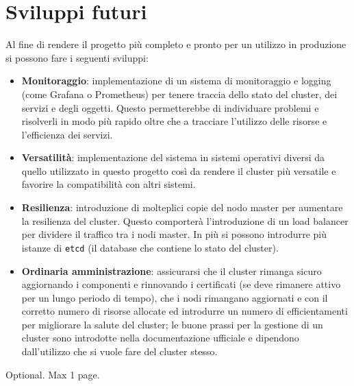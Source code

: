 \documentclass[12pt,a4paper,openright,twoside]{book}
\begin{document}
\section{Sviluppi futuri}
Al fine di rendere il progetto più completo e pronto per un utilizzo in produzione si possono fare i seguenti sviluppi:
\begin{itemize}
    \item {\textbf{Monitoraggio}: implementazione di un sistema di monitoraggio e logging (come Grafana o Prometheus) per tenere traccia dello stato del cluster, dei servizi e degli oggetti.
    Questo permetterebbe di individuare problemi e risolverli in modo più rapido oltre che a tracciare l'utilizzo delle risorse e l'efficienza dei servizi.
    }
    \item{\textbf{Versatilità}: implementazione del sistema in sistemi operativi diversi da quello utilizzato in questo progetto così da rendere il cluster più versatile e favorire la compatibilità con altri sistemi.
    }
    \item{
        \textbf{Resilienza}: introduzione di molteplici copie del nodo master per aumentare la resilienza del cluster. Questo comporterà l'introduzione di un load balancer per dividere il traffico tra i nodi master.
        In più si possono introdurre più istanze di \texttt{etcd} (il database che contiene lo stato del cluster)\cite{kubernetes}.
    }
    \item {
        \textbf{Ordinaria amministrazione}: assicurarsi che il cluster rimanga sicuro aggiornando i componenti e rinnovando i certificati (se deve rimanere
        attivo per un lungo periodo di tempo), che i nodi rimangano aggiornati e con il corretto numero di risorse allocate ed introdurre un numero di efficientamenti
        per migliorare la salute del cluster; le buone prassi per la gestione di un cluster sono introdotte nella documentazione ufficiale e dipendono dall'utilizzo che
        si vuole fare del cluster stesso\cite{kubernetes}.
    }
\end{itemize}


\backmatter

\nocite{*} %




\begin{acknowledgements} %
Optional. Max 1 page.
\end{acknowledgements}
\end{document}
